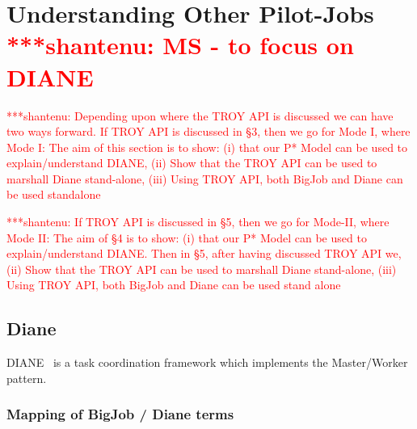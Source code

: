 \documentclass[conference,final]{IEEEtran}
\newcommand{\jhanote}[1]{ {\textcolor{red} { ***shantenu: #1 }}}
\newcommand{\jhanote}[1]{}
\begin{document}

\section{Understanding Other Pilot-Jobs \jhanote{MS - to focus on
    DIANE}}


\jhanote{Depending upon where the TROY API is discussed we can have
  two ways forward. If TROY API is discussed in \S 3, then we go for
  Mode I, where Mode I: The aim of this section is to show: (i) that
  our P* Model can be used to explain/understand DIANE, (ii) Show that
  the TROY API can be used to marshall Diane stand-alone, (iii) Using
  TROY API, both BigJob and Diane can be used standalone}

\jhanote{If TROY API is discussed in \S 5, then we go for Mode-II,
  where Mode II: The aim of \S 4 is to show: (i) that our P* Model can
  be used to explain/understand DIANE.  Then in \S 5, after having
  discussed TROY API we, (ii) Show that the TROY API can be used to
  marshall Diane stand-alone, (iii) Using TROY API, both BigJob and
  Diane can be used stand alone}


\subsection{Diane}

DIANE~\cite{Moscicki:908910} is a task coordination framework which implements 
the Master/Worker pattern. 

\subsubsection{Mapping of BigJob / Diane terms}
\end{document}
